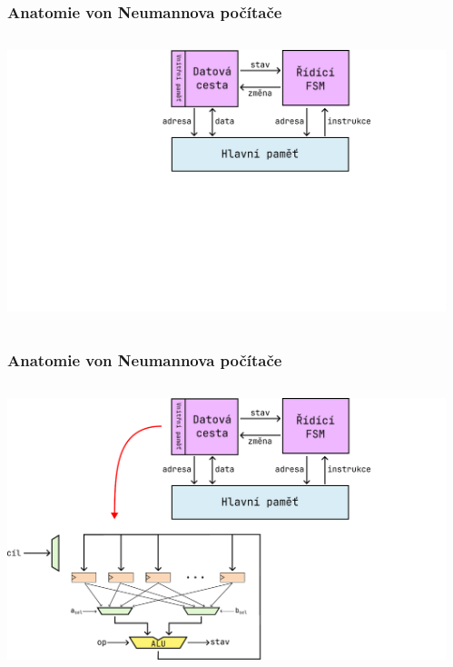 \documentclass[aspectratio=169,11pt,svgnames]{beamer}
\begin{document}
\begin{frame}
 \frametitle{Anatomie von Neumannova počítače}
 \begin{columns}[T]
  \begin{column}{.6\textwidth}
   \vspace*{-1em}
   \begin{center}
    \includegraphics[width=1.2\textwidth]{anatomy-1.pdf}
   \end{center}
  \end{column}
  \begin{column}{.39\textwidth}
  \end{column}
 \end{columns}
\end{frame}

\begin{frame}
 \frametitle{Anatomie von Neumannova počítače}
 \begin{columns}[T]
  \begin{column}{.6\textwidth}
   \vspace*{-1em}
   \begin{center}
    \includegraphics[width=1.2\textwidth]{anatomy-2.pdf}
   \end{center}
  \end{column}
  \begin{column}{.39\textwidth}
  \end{column}
 \end{columns}
\end{frame}
\end{document}
